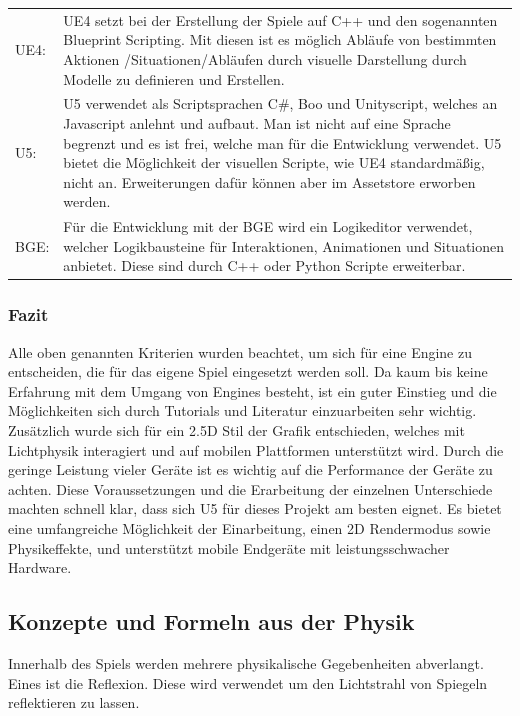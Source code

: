 \begin{table}[H]
\centering
\begin{tabular}{lp{14.5cm}}
\ac{UE4}:&
\ac{UE4} setzt bei der Erstellung der Spiele auf C++  und den sogenannten Blueprint Scripting. Mit diesen ist es möglich Abläufe von bestimmten Aktionen /Situationen/Abläufen durch visuelle Darstellung durch Modelle zu definieren und Erstellen.\\
\ac{U5}:&
\ac{U5} verwendet als Scriptsprachen C\#, Boo und Unityscript, welches an Javascript anlehnt und aufbaut. Man ist nicht auf eine Sprache begrenzt und es ist frei, welche man für die Entwicklung verwendet. \ac{U5} bietet die Möglichkeit der visuellen Scripte, wie \ac{UE4} standardmäßig, nicht an. Erweiterungen dafür können aber im Assetstore erworben werden.\\

\ac{BGE}:&
Für die Entwicklung mit der \ac{BGE} wird ein Logikeditor verwendet, welcher Logikbausteine für Interaktionen, Animationen und Situationen anbietet. Diese sind durch C++ oder Python Scripte erweiterbar.

\end{tabular}
\end{table}

\subsubsection{Fazit}
Alle oben genannten Kriterien wurden beachtet, um sich für eine Engine zu entscheiden, die für das eigene Spiel eingesetzt werden soll. Da kaum bis keine Erfahrung mit dem Umgang von Engines besteht, ist ein guter Einstieg und die Möglichkeiten sich durch Tutorials und Literatur einzuarbeiten sehr wichtig. Zusätzlich wurde sich für ein 2.5D Stil der Grafik entschieden, welches mit Lichtphysik interagiert und auf mobilen Plattformen unterstützt wird. Durch die geringe Leistung vieler Geräte ist es wichtig auf die Performance der Geräte zu achten. Diese Voraussetzungen und die Erarbeitung der einzelnen Unterschiede machten schnell klar, dass sich \ac{U5} für dieses Projekt am besten eignet. Es bietet eine umfangreiche Möglichkeit der Einarbeitung, einen 2D Rendermodus sowie Physikeffekte, und unterstützt mobile Endgeräte mit leistungsschwacher Hardware. 

\subsection{Konzepte und Formeln aus der Physik}
Innerhalb des Spiels werden mehrere physikalische Gegebenheiten abverlangt. Eines ist die Reflexion. Diese wird verwendet um den Lichtstrahl von Spiegeln reflektieren zu lassen.
